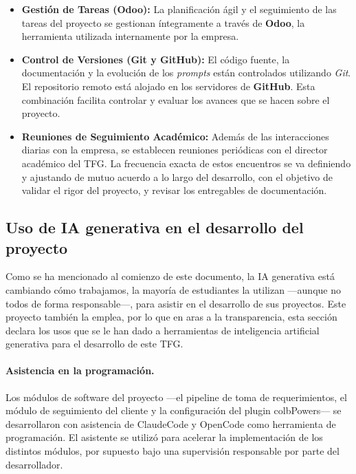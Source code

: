 \documentclass[11pt, letterpaper]{article}
\begin{document}
\begin{itemize}
    \item \textbf{Gestión de Tareas (Odoo):} La planificación ágil y el seguimiento de las tareas del proyecto se gestionan íntegramente a través de \textbf{Odoo}, la herramienta utilizada internamente por la empresa.
    
    \item \textbf{Control de Versiones (Git y GitHub):} El código fuente, la documentación y la evolución de los \textit{prompts} están controlados utilizando \textit{Git}. El repositorio remoto está alojado en los servidores de \textbf{GitHub}. Esta combinación facilita controlar y evaluar los avances que se hacen sobre el proyecto.
    
    \item \textbf{Reuniones de Seguimiento Académico:} Además de las interacciones diarias con la empresa, se establecen reuniones periódicas con el director académico del TFG. La frecuencia exacta de estos encuentros se va definiendo y ajustando de mutuo acuerdo a lo largo del desarrollo, con el objetivo de validar el rigor del proyecto, y revisar los entregables de documentación.
\end{itemize}

\newpage

\subsection{Uso de IA generativa en el desarrollo del proyecto}
\label{sec:uso_ia}

Como se ha mencionado al comienzo de este documento, la IA generativa está cambiando cómo trabajamos, la mayoría de estudiantes la utilizan ---aunque no todos de forma responsable---, para asistir en el desarrollo de sus proyectos. Este proyecto también la emplea, por lo que en aras a la transparencia, esta sección declara los usos que se le han dado a herramientas de inteligencia artificial generativa para el desarrollo de este TFG.

\paragraph{Asistencia en la programación.}
Los módulos de software del proyecto ---el pipeline de toma de requerimientos, el módulo de seguimiento del cliente y la configuración del plugin colbPowers--- se desarrollaron con asistencia de ClaudeCode y OpenCode como herramienta de programación. El asistente se utilizó para acelerar la implementación de los distintos módulos, por supuesto bajo una supervisión responsable por parte del desarrollador. 
\end{document}
